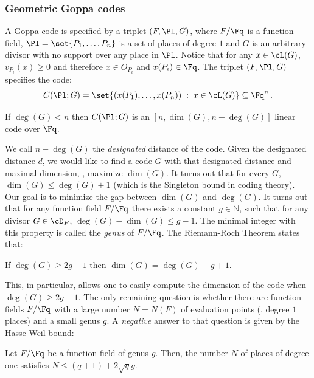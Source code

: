 \subsubsection{Geometric Goppa codes}\label{subsec:GoppaCodes}
A Goppa code is specified by a triplet $(F,\Pl,G)$, where $F/\Fq$
is a function field, $\Pl = \set{P_1,\ldots,P_n}$ is a set of
places of degree $1$ and $G$ is an arbitrary divisor with no
support over any place in $\Pl$. Notice that for any $x \in
\cL(G)$, $v_{P_i}(x) \ge 0$ and therefore $x \in O_{P_i}$ and $x
(P_i) \in \Fq $. The triplet $(F,\Pl,G)$ specifies the code:
$$C(\Pl;G)=\set{(x(P_1),\ldots,x(P_n)) \;:\; x \in \cL(G)} \subseteq \Fq ^n\,.$$

\begin{claim}[{\cite[Cor II.2.3]{S:93}}]\label{clm-goppa-code}
If $\deg(G) < n$ then $C(\Pl;G)$ is an $[n,\dim(G),n-\deg(G)]$
linear code over $\Fq $.
\end{claim}


We call $n-\deg(G)$ the \emph{designated} distance of the code.
Given the designated distance $d$, we would like to find a code $G$
with that designated distance and maximal dimension, \ie, maximize
$\dim(G)$. It turns out that for every $G$, $\dim(G) \le \deg(G)+1$
(which is the Singleton bound in coding theory). Our goal is to
minimize the gap between $\dim(G)$ and $\deg(G)$. It turns out that
for any function field $F/\Fq$ there exists a constant $g \in
\mathbb{N}$, such that for any divisor $G \in \cD_F$, $\deg(G) -
\dim(G) \le g-1$. The minimal integer with this property is called
the \emph{genus} of $F/\Fq $. The Riemann-Roch Theorem states that:

\begin{theorem}[{\cite[Thm I.5.17]{S:93}}] If $\deg(G) \ge 2g-1$ then
$\dim(G)=\deg(G)-g+1$.
\end{theorem}

This, in particular, allows one to easily compute the dimension of
the code when $\deg(G) \ge 2g-1$. The only remaining question is
whether there are function fields $F/\Fq$ with a large number
$N=N(F)$ of evaluation points (\ie, degree $1$ places) and a small
genus $g$. A \emph{negative} answer to that question is given by the Hasse-Weil bound:
\begin{theorem}
 \label{thm:hasse-weil}
Let $F/\Fq$ be a function field of genus $g$. Then, the number $N$ of places of degree one satisfies $N \le (q+1)+2\sqrt{q}g$.
\end{theorem}


